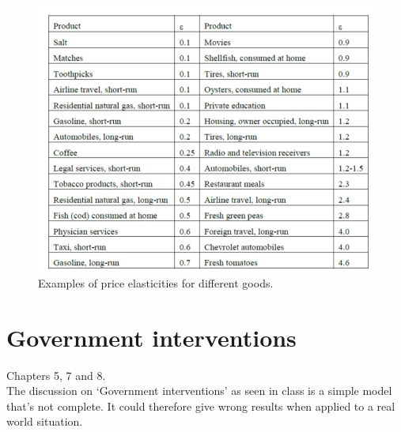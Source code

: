 \documentclass[12pt, a4paper, titlepage]{extarticle}
\begin{document}
	\begin{figure}[h]
	\centering
		\includegraphics{ElasticityTable}
		\caption{Examples of price elasticities for different goods. \label{imgElasticityTable}}
	\end{figure}

	\pagebreak
	\section{Government interventions}
	Chapters 5, 7 and 8.\\
	The discussion on `Government interventions' as seen in class is a simple model that's not complete. 
	It could therefore give wrong results when applied to a real world situation.
	
\end{document}
